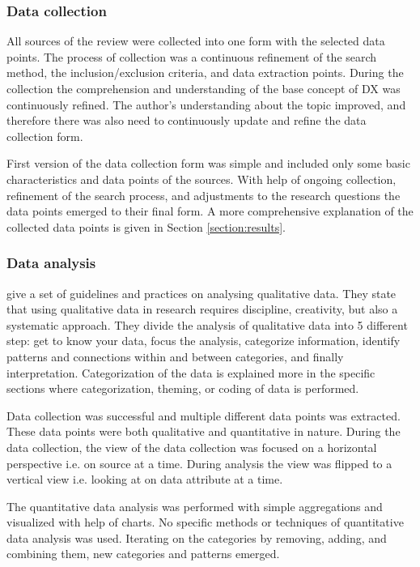 \documentclass[english, 12pt, a4paper, sci, utf8, a-1b, online]{aaltothesis}
\begin{document}
\subsubsection{Data collection}

All sources of the review were collected into one form with the selected data points. The process of collection was a continuous refinement of the search method, the inclusion/exclusion criteria, and data extraction points. During the collection the comprehension and understanding of the base concept of DX was continuously refined. The author's understanding about the topic improved, and therefore there was also need to continuously update and refine the data collection form.

First version of the data collection form was simple and included only some basic characteristics and data points of the sources. With help of ongoing collection, refinement of the search process, and adjustments to the research questions the data points emerged to their final form. A more comprehensive explanation of the collected data points is given in Section \ref{section:results}.

\subsubsection{Data analysis}

\textcite{analyzing-qualitative-data} give a set of guidelines and practices on analysing qualitative data. They state that using qualitative data in research requires discipline, creativity, but also a systematic approach. They divide the analysis of qualitative data into 5 different step: get to know your data, focus the analysis, categorize information, identify patterns and connections within and between categories, and finally interpretation. Categorization of the data is explained more in the specific sections where categorization, theming, or coding of data is performed.

Data collection was successful and multiple different data points was extracted. These data points were both qualitative and quantitative in nature. During the data collection, the view of the data collection was focused on a horizontal perspective i.e. on source at a time. During analysis the view was flipped to a vertical view i.e. looking at on data attribute at a time.

The quantitative data analysis was performed with simple aggregations and visualized with help of charts. No specific methods or techniques of quantitative data analysis was used. Iterating on the categories by removing, adding, and combining them, new categories and patterns emerged.
\end{document}
